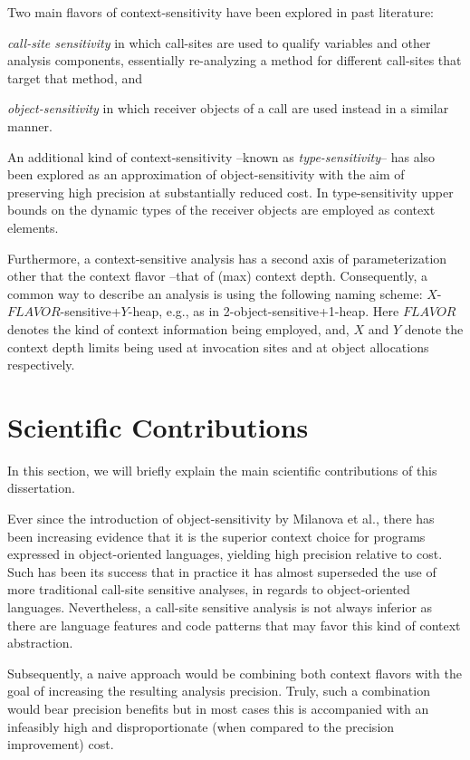 Two main flavors of context-sensitivity have been explored in past literature: \begin{inparaenum}[(1)]
\item \emph{call-site sensitivity} in which call-sites are used to qualify variables and other analysis components, essentially re-analyzing a method for different call-sites that target that method, and
\item \emph{object-sensitivity} in which receiver objects of a call are used instead in a similar manner.
\end{inparaenum}
An additional kind of context-sensitivity --known as \emph{type-sensitivity}-- has also been explored as an approximation of object-sensitivity with the aim of preserving high precision at substantially reduced cost. In type-sensitivity upper bounds on the dynamic types of the receiver objects are employed as context elements. 

Furthermore, a context-sensitive analysis has a second axis of parameterization other that the context flavor --that of (max) context depth. Consequently, a common way to describe an analysis is using the following naming scheme: $X$-$FLAVOR$-sensitive+$Y$-heap, e.g., as in 2-object-sensitive+1-heap. Here $FLAVOR$ denotes the kind of context information being employed, and, $X$ and $Y$ denote the context depth limits being used at invocation sites and at object allocations respectively.


\section{Scientific Contributions}

In this section, we will briefly explain the main scientific contributions of this dissertation.

Ever since the introduction of object-sensitivity by Milanova et al., there has been increasing evidence that it is the superior context choice for programs expressed in object-oriented languages, yielding high precision relative to cost. Such has been its success that in practice it has almost superseded the use of more traditional call-site sensitive analyses, in regards to object-oriented languages. Nevertheless, a call-site sensitive analysis is not always inferior as there are language features and code patterns that may favor this kind of context abstraction.

Subsequently, a naive approach would be combining both context flavors with the goal of increasing the resulting analysis precision. Truly, such a combination would bear precision benefits but in most cases this is accompanied with an infeasibly high and disproportionate (when compared to the precision improvement) cost.

